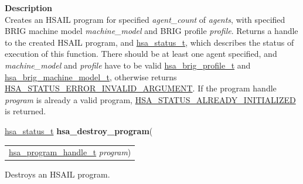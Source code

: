 \documentclass[final]{book}
\newcommand{\hsaarg}[1]{\textit{#1}}
\begin{document}
\begin{appendices}
\vspace{-4mm}\noindent\textbf{Description}\\[1mm]
Creates an HSAIL program for specified \textit{agent_count} of \textit{agents}, with specified BRIG machine model \textit{machine_model} and BRIG profile \textit{profile}. Returns a handle to the created HSAIL program, and \hyperlink{group--status-1gad755322e7ff95456520e8abdbe90d225}{hsa_status_t}, which describes the status of execution of this function. There should be at least one agent specified, and \textit{machine_model} and \textit{profile} have to be valid \hyperlink{group--FinalizerCoreApi-1ga65db17c4abda0ac23cd290eaef20fe34}{hsa_brig_profile_t} and \hyperlink{group--FinalizerCoreApi-1ga8f2ea76ca530d6fdb60f38f62368a89a}{hsa_brig_machine_model_t}, otherwise returns \hyperlink{group--status-1ggad755322e7ff95456520e8abdbe90d225ac7d3651f75107d2a6a8ba3b25683c030}{HSA_STATUS_ERROR_INVALID_ARGUMENT}. If the program handle \textit{program} is already a valid program, \hyperlink{group--status-1ggad755322e7ff95456520e8abdbe90d225a10496aec7462cb613a5aa589510cacc9}{HSA_STATUS_ALREADY_INITIALIZED} is returned. 


\noindent\begin{tcolorbox}[breakable,nobeforeafter,colframe=white,colback=lightgray,left=0mm]
\hyperlink{group--status-1gad755322e7ff95456520e8abdbe90d225}{hsa_status_t} \hypertarget{group--HsailLinkerServiceLayer-1gada57f0a1d9e7d0ec665c36c1a5d2aa30}{\textbf{hsa_destroy_program}}(
\vspace{-3.5mm}\begin{longtable}{@{}p{\textwidth}}
\hspace{1.7em}\hyperlink{group--HsailLinkerServiceLayer-1ga7b28ca39da981be49aac99608eb386cb}{hsa_program_handle_t} \hsaarg{program})\end{longtable}

\end{tcolorbox}
Destroys an HSAIL program.


\end{appendices}
\end{document}
